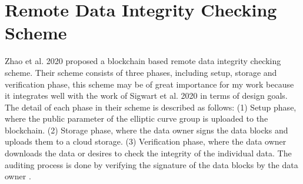 \section{Remote Data Integrity Checking Scheme}
Zhao et al. 2020 proposed a blockchain based remote data integrity checking scheme. Their scheme consists of three phases, including setup, storage and verification phase, this scheme may be of great importance for my work because it integrates well with the work of Sigwart et al. 2020 in terms of design goals. The detail of each phase in their scheme is described as follows: (1) Setup phase, where the public parameter of the elliptic curve group is uploaded to the blockchain. (2) Storage phase, where the data owner signs the data blocks and uploads them to a cloud storage. (3) Verification phase, where the data owner downloads the data or desires to check the integrity of the individual data. The auditing process is done by verifying the signature of the data blocks by the data owner \cite[1]{zhao2020blockchain}.

